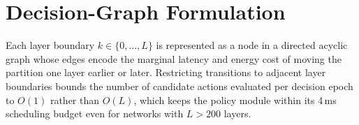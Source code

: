 \section{Decision-Graph Formulation}

Each layer boundary $k \in \{0, \ldots, L\}$ is represented as a node in a directed acyclic graph whose edges encode the marginal latency and energy cost of moving the partition one layer earlier or later. Restricting transitions to adjacent layer boundaries bounds the number of candidate actions evaluated per decision epoch to $O(1)$ rather than $O(L)$, which keeps the policy module within its 4\,ms scheduling budget even for networks with $L > 200$ layers.
